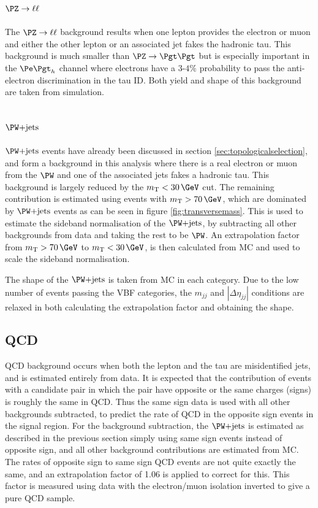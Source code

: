 \subsection{$\PZ\to\ell\ell$}
\label{sec:backgroundEstimation_Zll}

The $\PZ\to\ell\ell$ background results when one lepton provides the electron or
muon and either the other lepton or an associated jet fakes the hadronic tau. This
background is much smaller than $\ZToTauTau$ but is especially important in the
$\etau$ channel where electrons have a $3$-$4\%$ probability to pass the
anti-electron discrimination in the tau ID. Both yield and shape of this
background are taken from simulation.

\subsection{$\WJets$}
\label{sec:backgroundEstimation_WplusJets}

$\WJets$ events have already been discussed in section \ref{sec:topologicalselection},
and form a background in this analysis where there is a real electron or
muon from the $\PW$ and one of the associated jets fakes a hadronic tau. This
background is largely reduced by the $m_{\text{T}}< 30\,\GeV$ cut. 
The remaining contribution is estimated using 
events with $m_{\text{T}}> 70\,\GeV$, which are dominated by $\WJets$ 
events as can be seen in figure \ref{fig:transversemass}. 
This is used to estimate the sideband normalisation of the $\WJets$, by
subtracting all other backgrounds from data and taking the rest to be $\PW$.
An extrapolation factor from  $m_{\text{T}} > 70\,\GeV$ to $m_{\text{T}}< 30\,\GeV$, 
is then calculated from MC and used to scale the sideband normalisation.

The shape of the $\WJets$ is taken from MC in each category. Due to the low number of
events passing the VBF categories, the $m_{jj}$ and $|\Delta\eta_{jj}|$
conditions are relaxed in both calculating the extrapolation factor and
obtaining the shape.

\subsection{QCD}
\label{sec:backgroundEstimation_QCD}

QCD background occurs when both the lepton and the tau are misidentified jets, and is estimated 
entirely from data. It is expected that the contribution of events with a
candidate pair in which the pair have opposite or the same
charges (signs) is roughly the same in QCD. Thus the same
sign data is used with all other backgrounds subtracted, to predict the rate of
QCD in the opposite sign events in the signal region. 
For the background subtraction, the $\WJets$ is 
estimated as described in the previous section simply using same sign
events instead of opposite sign, and all other background
contributions are estimated from \ac{MC}. The rates of opposite sign to same
sign QCD events are not quite exactly the same, and an extrapolation factor of
1.06 is applied to correct for this. This factor is measured using data with the 
electron/muon isolation inverted to give a pure QCD sample. 

